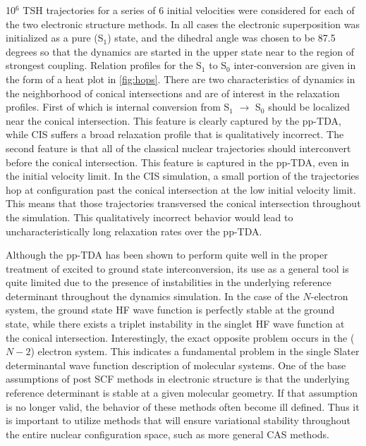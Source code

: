 10$^6$ TSH trajectories for a series of 6 initial velocities were considered for
each of the two electronic structure methods.  In all cases the electronic
superposition was initialized as a pure (S$_1$) state, and the dihedral angle
was chosen to be 87.5 degrees so that the dynamics are started in the upper
state near to the region of strongest coupling. Relation profiles for the S$_1$
to S$_0$ inter-conversion are given in the form of a heat plot in
\cref{fig:hops}. There are two characteristics of dynamics in the neighborhood
of conical intersections and are of interest in the relaxation
profiles\cite{Hynes14_97}. First of which is internal conversion from S$_1$
$\rightarrow$ S$_0$ should be localized near the conical intersection. This
feature is clearly captured by the pp-TDA, while CIS suffers a broad relaxation
profile that is qualitatively incorrect. 
The second feature is that all of the classical nuclear trajectories should
interconvert before the conical intersection. This feature is captured in the
pp-TDA, even in the initial velocity limit. In the CIS simulation, a small
portion of the trajectories hop at configuration past the conical intersection
at the low initial velocity limit. This means that those trajectories
transversed the conical intersection throughout the simulation. This
qualitatively incorrect behavior would lead to uncharacteristically long
relaxation rates over the pp-TDA.

Although the pp-TDA has been shown to perform quite well in the proper treatment
of excited to ground state interconversion, its use as a general tool is quite
limited due to the presence of instabilities in the underlying reference
determinant throughout the dynamics simulation. 
In the case of the
$N$-electron system, the ground state HF wave function is perfectly stable at
the ground state, while there exists a triplet instability in the singlet HF
wave function at the conical intersection. Interestingly, the exact opposite
problem occurs in the ($N-2$) electron system. This indicates a fundamental
problem in the single Slater determinantal wave function description of
molecular systems. One of the base assumptions of post SCF methods in electronic
structure is that the underlying reference determinant is stable at a given
molecular geometry. If that assumption is no longer valid, the behavior of
these methods often become ill defined. Thus it is important to utilize methods
that will ensure variational stability throughout the entire nuclear
configuration space, such as more general CAS methods.

